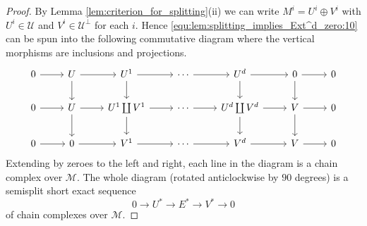 \documentclass[12pt,reqno]{amsart}
\def\cM{\mathscr{M}}
\def\cU{\mathscr{U}}
\numberwithin{equation}{section}
\theoremstyle{definition}
\theoremstyle{theorem}
\theoremstyle{definition}
\begin{document}
\begin{proof}
By Lemma \ref{lem:criterion_for_splitting}(ii) we can write $M^i = U^i \oplus V^i$ with $U^i \in \cU$ and $V^i \in \cU^{ \perp }$ for each $i$.  Hence \eqref{equ:lem:splitting_implies_Ext^d_zero:10} can be spun into the following commutative diagram where the vertical morphisms are inclusions and projections.
\[
  \begin{tikzcd}
	0 & U & {U^1} & \cdots & {U^d} & 0 & 0 \\
	0 & U & {U^1 \coprod V^1} & \cdots & {U^d \coprod V^d} & V & 0 \\
	0 & 0 & {V^1} & \cdots & {V^d} & V & 0
	\arrow[from=1-1, to=1-2]
	\arrow[from=1-2, to=1-3]
	\arrow[from=1-2, to=2-2]
	\arrow[from=1-3, to=1-4]
	\arrow[from=1-3, to=2-3]
	\arrow[from=1-4, to=1-5]
	\arrow[from=1-5, to=1-6]
	\arrow[from=1-5, to=2-5]
	\arrow[from=1-6, to=1-7]
	\arrow[from=1-6, to=2-6]
	\arrow[from=2-1, to=2-2]
	\arrow[from=2-2, to=2-3]
	\arrow[from=2-2, to=3-2]
	\arrow[from=2-3, to=2-4]
	\arrow[from=2-3, to=3-3]
	\arrow[from=2-4, to=2-5]
	\arrow[from=2-5, to=2-6]
	\arrow[from=2-5, to=3-5]
	\arrow[from=2-6, to=2-7]
	\arrow[from=2-6, to=3-6]
	\arrow[from=3-1, to=3-2]
	\arrow[from=3-2, to=3-3]
	\arrow[from=3-3, to=3-4]
	\arrow[from=3-4, to=3-5]
	\arrow[from=3-5, to=3-6]
	\arrow[from=3-6, to=3-7]
  \end{tikzcd}
\]
Extending by zeroes to the left and right, each line in the diagram is a chain complex over $\cM\!$.  The whole diagram (rotated anticlockwise by $90$ degrees) is a semisplit short exact sequence
\begin{equation}
\label{equ:lem:splitting_implies_Ext^d_zero:20}
  0 \xrightarrow{} U^* \xrightarrow{} E^* \xrightarrow{} V^* \xrightarrow{} 0
\end{equation}
of chain complexes over $\cM\!$.


\end{proof}
\end{document}
